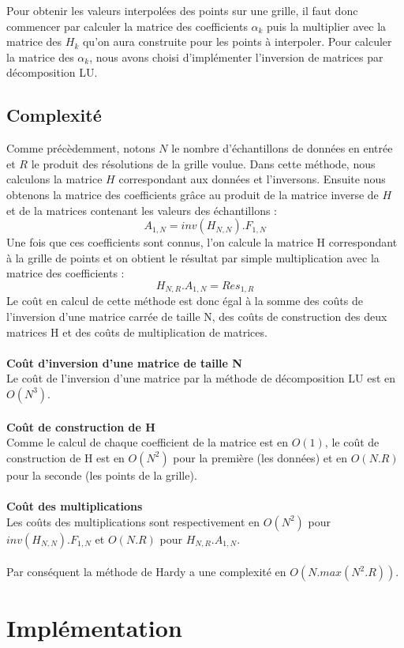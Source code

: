 \documentclass[a4paper,9pt]{article}
\begin{document}
Pour obtenir les valeurs interpolées des points sur une grille, il faut donc commencer par calculer la matrice des coefficients $\alpha_{k}$ puis la multiplier avec la matrice des $H_{k}$ qu'on aura construite pour les points à interpoler. Pour calculer la matrice des $\alpha_{k}$, nous avons choisi d'implémenter l'inversion de matrices par décomposition LU.

\subsection{Complexité}
\label{subsec:hardy_complexite}
Comme précèdemment, notons $N$ le nombre d'échantillons de données en entrée et $R$ le produit des résolutions de la grille voulue.
Dans cette méthode, nous calculons la matrice $H$ correspondant aux données et l'inversons. Ensuite nous obtenons la matrice des coefficients grâce au produit de la matrice inverse de $H$ et de la matrices contenant les valeurs des échantillons :
$$A_{1,N} = inv(H_{N,N}).F_{1,N}$$
Une fois que ces coefficients sont connus, l'on calcule la matrice H correspondant à la grille de points et on obtient le résultat par simple multiplication avec la matrice des coefficients :
$$H_{N,R}.A_{1,N}=Res_{1,R}$$
Le coût en calcul de cette méthode est donc égal à la somme des coûts de l'inversion d'une matrice carrée de taille N, des coûts de construction des deux matrices H et des coûts de multiplication de matrices.\\\\
\textbf{Coût d'inversion d'une matrice de taille N}\\
Le coût de l'inversion d'une matrice par la méthode de décomposition LU est en $O(N^{3})$.\\\\
\textbf{Coût de construction de H}\\
Comme le calcul de chaque coefficient de la matrice est en $O(1)$, le coût de construction de H est en $O(N^{2})$ pour la première (les données) et en $O(N.R)$ pour la seconde (les points de la grille).\\\\
\textbf{Coût des multiplications}\\
Les coûts des multiplications sont respectivement en $O(N^{2})$ pour $inv(H_{N,N}).F_{1,N}$ et $O(N.R)$ pour $H_{N,R}.A_{1,N}$.\\\\
Par conséquent la méthode de Hardy a une complexité en \textbf{$O(N.max(N^{2}.R))$}.


\section{Implémentation}
\label{sec:implementation}
\end{document}
